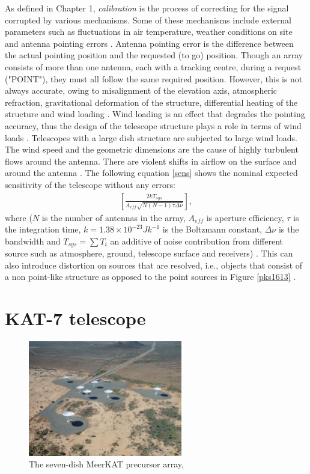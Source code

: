 As defined in Chapter 1, \textit{calibration} is the process of correcting for the signal corrupted by various mechanisms. Some of these mechanisms include external parameters such as fluctuations in air temperature, weather conditions on site and antenna pointing errors \citep{taylor1999synthesis}. Antenna pointing error is the difference between the actual pointing position and the requested (to go) position. Though an array consists of more than one antenna, each with a tracking centre, during a request ("POINT"), they must all follow the same required position. However, this is not always accurate, owing to misalignment of the elevation axis, atmospheric refraction, gravitational deformation of the structure, differential heating of the structure and wind loading \citep{taylor1999synthesis}. Wind loading is an effect that degrades the pointing accuracy, thus the design of the telescope structure plays a role in terms of wind loads \citep{smithdynamic}. Telescopes with a large dish structure are subjected to large wind loads. The wind speed and the geometric dimensions are the cause of highly turbulent flows around the antenna. There are violent shifts in airflow on the surface and around the antenna \citep{upnere2012characterization}. The following equation \ref{sens} shows the nominal expected sensitivity of the telescope without any errors:
\begin{align}
\left[\frac{2kT_{sys}}{A_{eff}\sqrt{N(N-1)\tau \Delta \nu}}\right]
\label{sens},
\end{align}
 where ($N$ is the number of antennas in the array,  $A_{eff}$ is aperture efficiency, $\tau$ is the integration time, $k=1.38\times 10^{-23}Jk^{-1}$ is the Boltzmann constant, $\Delta \nu$ is the bandwidth and $T_{sys}=\sum T_{i}$ an additive of noise contribution from different source such as atmosphere, ground, telescope surface and receivers) \citep{wilson2013tools}. This can also introduce distortion on sources that are resolved, i.e., objects that consist of a non point-like structure as opposed to the point sources in Figure \ref{pks1613} \citep{Calibration}. 



\section{KAT-7 telescope}
\label{kat7}

\begin{figure}[H]
  \centering
    \includegraphics[width=0.6\textwidth]{images/K7.png}
    \caption{The seven-dish MeerKAT precursor array, \citep{carignan2013kat}}
  \label{images/kat7.png}
\end{figure}

